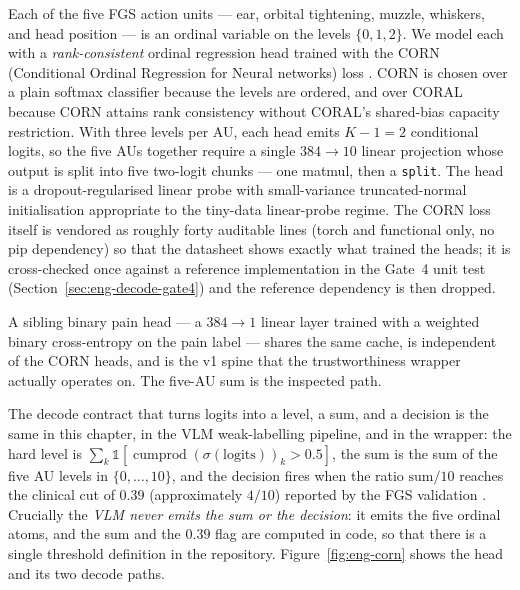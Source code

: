 Each of the five FGS action units --- ear, orbital tightening, muzzle, whiskers,
and head position --- is an ordinal variable on the levels $\{0,1,2\}$. We model
each with a \emph{rank-consistent} ordinal regression head trained with the CORN
(Conditional Ordinal Regression for Neural networks) loss
\citep{shi2023corn}. CORN is chosen over a plain softmax classifier because the
levels are ordered, and over CORAL \citep{cao2020coral} because CORN attains
rank consistency without CORAL's shared-bias capacity restriction. With three
levels per AU, each head emits $K-1 = 2$ conditional logits, so the five AUs
together require a single $384 \rightarrow 10$ linear projection whose output is
split into five two-logit chunks --- one matmul, then a \texttt{split}. The head
is a dropout-regularised linear probe with small-variance truncated-normal
initialisation appropriate to the tiny-data linear-probe regime. The CORN loss
itself is vendored as roughly forty auditable lines (torch and functional only,
no pip dependency) so that the datasheet shows exactly what trained the heads;
it is cross-checked once against a reference implementation in the Gate~4 unit
test (Section~\ref{sec:eng-decode-gate4}) and the reference dependency is then
dropped.

A sibling binary pain head --- a $384 \rightarrow 1$ linear layer trained with a
weighted binary cross-entropy on the pain label --- shares the same cache, is
independent of the CORN heads, and is the v1 spine that the trustworthiness
wrapper actually operates on. The five-AU sum is the inspected path.

The decode contract that turns logits into a level, a sum, and a decision is the
same in this chapter, in the VLM weak-labelling pipeline, and in the wrapper:
the hard level is $\sum_k \mathbb{1}[\operatorname{cumprod}(\sigma(\text{logits}))_k > 0.5]$,
the sum is the sum of the five AU levels in $\{0,\dots,10\}$, and the decision
fires when the ratio $\text{sum}/10$ reaches the clinical cut of $0.39$
(approximately $4/10$) reported by the FGS validation \citep{evangelista2019}.
Crucially the \emph{VLM never emits the sum or the decision}: it emits the five
ordinal atoms, and the sum and the $0.39$ flag are computed in code, so that
there is a single threshold definition in the repository. Figure~\ref{fig:eng-corn}
shows the head and its two decode paths.

